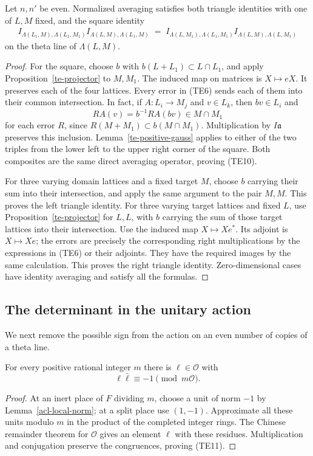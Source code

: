 \begin{proposition}\label{te-exact-paths}
Let $n,n'$ be even.  Normalized averaging satisfies both
triangle identities with one of $L,M$ fixed, and the
square identity
\[
 \begin{split}
 I_{\Lambda(L_1,M),\Lambda(L_1,M_1)}
 I_{\Lambda(L,M),\Lambda(L_1,M)}
 \;=\;
 I_{\Lambda(L,M_1),\Lambda(L_1,M_1)}
 I_{\Lambda(L,M),\Lambda(L,M_1)}
 \end{split}
 \tag{TE10}
\]
on the theta line of $\Lambda(L,M)$.
\end{proposition}
\begin{proof}
For the square, choose $b$ with
$b(L+L_1)\subset L\cap L_1$, and apply
Proposition~\ref{te-projector} to $M,M_1$.
The induced map on matrices is $X\mapsto eX$.
It preserves each of the four lattices.
Every error in (TE6) sends each of them into their
common intersection.  In fact, if $A:L_i\to M_j$
and $v\in L_k$, then $bv\in L_i$ and
\[
       R A(v)=b^{-1}R A(bv)\in M\cap M_1
\]
for each error $R$, since $R(M+M_1)\subset b(M\cap M_1)$.
Multiplication by $I\mathfrak a$ preserves this inclusion.
Lemma~\ref{te-positive-gauss} applies to either of the
two triples from the lower left to the upper right
corner of the square.  Both composites are the same
direct averaging operator, proving (TE10).

For three varying domain lattices and a fixed target
$M$, choose $b$ carrying their sum into their
intersection, and apply the same argument to the pair
$M,M$.  This proves the left triangle identity.
For three varying target lattices and fixed $L$, use
Proposition~\ref{te-projector} for $L,L$, with $b$
carrying the sum of those target lattices into their
intersection.  Use the induced map $X\mapsto Xe^*$.
Its adjoint is $X\mapsto Xe$; the errors are precisely
the corresponding right multiplications by the
expressions in (TE6) or their adjoints.  They have the
required images by the same calculation.  This proves
the right triangle identity.  Zero-dimensional cases
have identity averaging and satisfy all the formulas.
\end{proof}

\subsection{The determinant in the unitary action}

We next remove the possible sign from the action on an
even number of copies of a theta line.

\begin{lemma}\label{te-negative-norm}
For every positive rational integer $m$ there is
$\ell\in\mathcal O$ with
\[
                         \ell\bar\ell\equiv-1\pmod{m\mathcal O}.
 \tag{TE11}
\]
\end{lemma}
\begin{proof}
At an inert place of $F$ dividing $m$, choose a unit
of norm $-1$ by Lemma~\ref{acl-local-norm}; at a split
place use $(1,-1)$.  Approximate all these units modulo
$m$ in the product of the completed integer rings.
The Chinese remainder theorem for $\mathcal O$ gives
an element $\ell$ with these residues.  Multiplication
and conjugation preserve the congruences, proving (TE11).
\end{proof}

